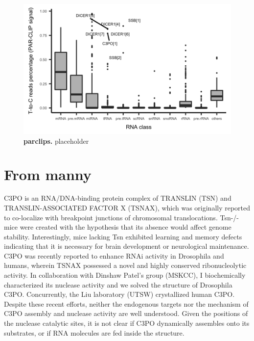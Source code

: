 \documentclass[12pt]{rockefeller}
\begin{document}
\begin{figure}[!ht]%
\centering
\includegraphics[width = \textwidth]{parclips.png}%
\caption[parclips]
{\textbf{parclips.}
placeholder}
\centering
\label{parclips}%
\end{figure}

\section{From manny}
C3PO is an RNA/DNA-binding protein complex of TRANSLIN (TSN) and TRANSLIN-ASSOCIATED FACTOR X (TSNAX), which was originally reported to co-localize with breakpoint junctions of chromosomal translocations. Tsn-/- mice were created with the hypothesis that its absence would affect genome stability. Interestingly, mice lacking Tsn exhibited learning and memory defects indicating that it is necessary for brain development or neurological maintenance. C3PO was recently reported to enhance RNAi activity in Drosophila and humans, wherein TSNAX possessed a novel and highly conserved ribonucleolytic activity. In collaboration with Dinshaw Patel’s group (MSKCC), I biochemically characterized its nuclease activity and we solved the structure of Drosophila C3PO. Concurrently, the Liu laboratory (UTSW) crystallized human C3PO. Despite these recent efforts, neither the endogenous targets nor the mechanism of C3PO assembly and nuclease activity are well understood. Given the positions of the nuclease catalytic sites, it is not clear if C3PO dynamically assembles onto its substrates, or if RNA molecules are fed inside the structure.
\end{document}
